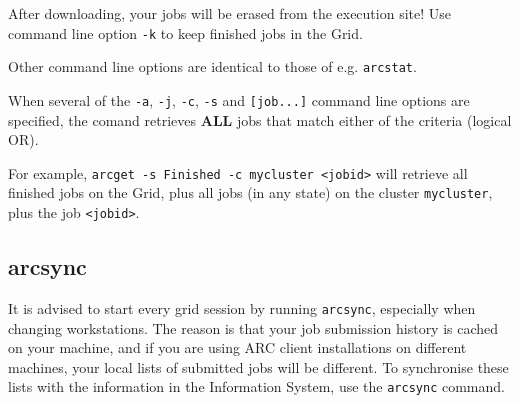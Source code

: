 \begin{framed}
 After downloading, your jobs will be erased from the execution site! Use command line option \verb#-k#
 to keep finished jobs in the Grid.
\end{framed}

Other command line options are identical to those of e.g. \verb#arcstat#.

\begin{framed}
  When several of the \verb#-a#,  \verb#-j#, \verb#-c#, \verb#-s# and \verb#[job...]#
  command line options are specified, the comand retrieves \textbf{ALL} jobs that
  match either of the criteria (logical OR).

  For example, \verb#arcget -s Finished -c mycluster <jobid># will retrieve all finished
  jobs on the Grid, plus all jobs (in any state) on the cluster \verb#mycluster#, plus the job \verb#<jobid>#.
\end{framed}


\subsection{arcsync}
\label{sec:arcsync}

It is advised to start every grid session by running \texttt{arcsync},
especially when changing workstations. The reason is that your job submission
history is cached on your machine, and if you are using ARC client
installations on different machines, your local lists of submitted jobs will be different. To synchronise
these lists with the information in the Information System, use the
\texttt{arcsync}  command.

